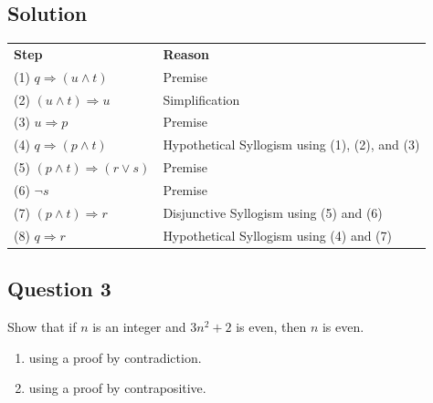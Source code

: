 \documentclass{article}
\begin{document}
\subsection*{Solution}
    \begin{center}
    \begin{tabular}{ll}
        \textbf{Step} & \textbf{Reason} \\
        (1) $q \Rightarrow (u \land t)$ & Premise \\
        (2) $(u \land t) \Rightarrow u$ & Simplification \\
        (3) $u \Rightarrow p$ & Premise \\
        (4) $q \Rightarrow (p \land t)$ & Hypothetical Syllogism using (1), (2), and (3) \\
        (5) $(p \land t) \Rightarrow (r \lor s)$ & Premise \\
        (6) $\neg s$ & Premise \\
        (7) $(p \land t) \Rightarrow r$ & Disjunctive Syllogism using (5) and (6) \\
        (8) $q \Rightarrow r$ & Hypothetical Syllogism using (4) and (7) \\
    \end{tabular}
    \end{center}

\subsection*{Question 3}
    Show that if $n$ is an integer and $3n^2 + 2$ is even, then $n$ is even.
    \begin{enumerate}
        \item using a proof by contradiction.
        \item using a proof by contrapositive.
    \end{enumerate}
\end{document}
